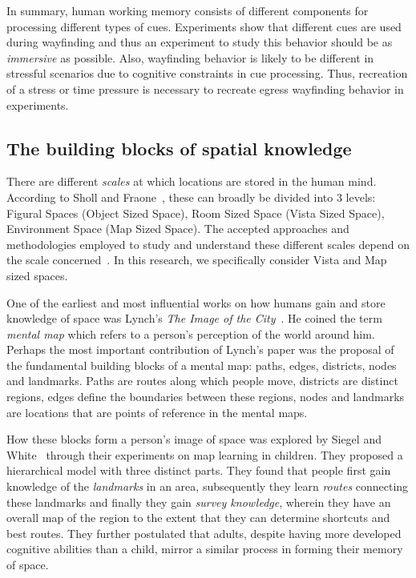 In summary, human working memory consists of different components for processing different types of cues. Experiments show that different cues are used during wayfinding and thus an experiment to study this behavior should be as \emph{immersive} as possible. Also, wayfinding behavior is likely to be different in stressful scenarios due to cognitive constraints in cue processing. Thus, recreation of a stress or time pressure is necessary to recreate egress wayfinding behavior in experiments.

\subsection{The building blocks of spatial knowledge} %
\label{sub:how_people_gain_spatial_information}

There are different {\em scales} at which locations are stored in the human mind. According to Sholl and Fraone~\cite{Sholl:2004vu}, these can broadly be divided into 3 levels: Figural Spaces (Object Sized Space), Room Sized Space (Vista Sized Space), Environment Space (Map Sized Space). The accepted approaches and methodologies employed to study and understand these different scales depend on the scale concerned~\cite{Sholl:2004vu}. In this research, we specifically consider Vista and Map sized spaces.

One of the earliest and most influential works on how humans gain and store knowledge of space was Lynch's \emph{The Image of the City}~\cite{lynch_image_1960}. He coined the term \emph{mental map} which refers to a person's perception of the world around him. Perhaps the most important contribution of Lynch's paper was the proposal of the fundamental building blocks of a mental map: paths, edges, districts, nodes and landmarks. Paths are routes along which people move, districts are distinct regions, edges define the boundaries between these regions, nodes and landmarks are locations that are points of reference in the mental maps.

How these blocks form a person's image of space was explored by Siegel and White~\cite{Siegel19759} through their experiments on map learning in children. They proposed a hierarchical model with three distinct parts. They found that people first gain knowledge of the \emph{landmarks} in an area, subsequently they learn \emph{routes} connecting these landmarks and finally they gain \emph{survey knowledge}, wherein they have an overall map of the region to the extent that they can determine shortcuts and best routes. They further postulated that adults, despite having more developed cognitive abilities than a child, mirror a similar process in forming their memory of space.

